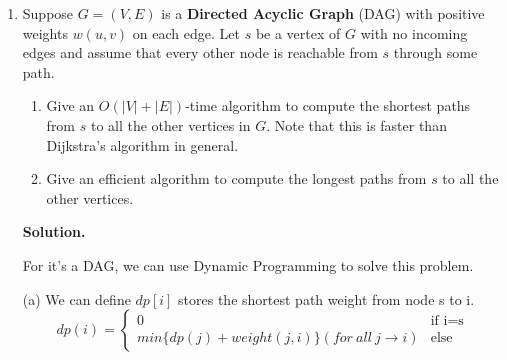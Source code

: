 \documentclass[12pt,a4paper]{article}
\theoremstyle{definition}
\begin{document}
\begin{enumerate}
	(b)

	\textbf{Necessity.}

	If an edge does not lie on any simple cycle of $G$, the nodes according to the edge cannot be connected after removing the edge. Thus the whole graph $G$ disconnects too.
	Therefore, the edge is a bridge.

	\textbf{Sufficiency.}

	Assume an edge lies on a simple cycle of $G$. After removing the edge, the circle still connects and $G$ doesn't disconnect too.
	Thus it cannot lie on any simple cycle of $G$.

	(c)
	Consider a biconnected component of $G$. For $G$ is connected graph, the component must connect with at least one edge. 
	Because a biconnected component of $G$ is the maximal set of edges such that any two edges in the set lie on a common simple cycle. 
	The connected edge cannot be added to the biconnected component and it does not lie on any simple cycle. If it lies, it will be in a biconnected component.
	Thus according to (b), the edge is an bridge. And for all edges, it can be either nonbridge or an edge in a biconnected component.

	Therefore, the biconnected components of $G$ partition the nonbridge edges of $G$.
	\item
    Suppose $G=(V, E)$ is a \textbf{Directed Acyclic Graph} (DAG) with positive weights $w(u, v)$ on each edge. Let $s$ be a vertex of $G$ with no incoming edges and assume that every other node is reachable from $s$ through some path.
    
    \begin{enumerate}
    	\item
    	Give an $O(|V|+|E|)$-time algorithm to compute the shortest paths from $s$ to all the other vertices in $G$. Note that this is faster than Dijkstra's algorithm in general.
    	\item
    	Give an efficient algorithm to compute the longest paths from $s$ to all the other vertices.
    \end{enumerate}
	
	\textbf{Solution.}

	For it's a DAG, we can use Dynamic Programming to solve this problem.

	(a)
	We can define $dp[i]$ stores the shortest path weight from node s to i.
	\begin{equation}
		dp(i)=
		\begin{cases}
			0&\mbox{if i=s}\\
			min\{dp(j)+weight(j,i)\}(for\ all\ j\rightarrow i) &\mbox{else}
		\end{cases}
	\end{equation}


\end{enumerate}
\end{document}
